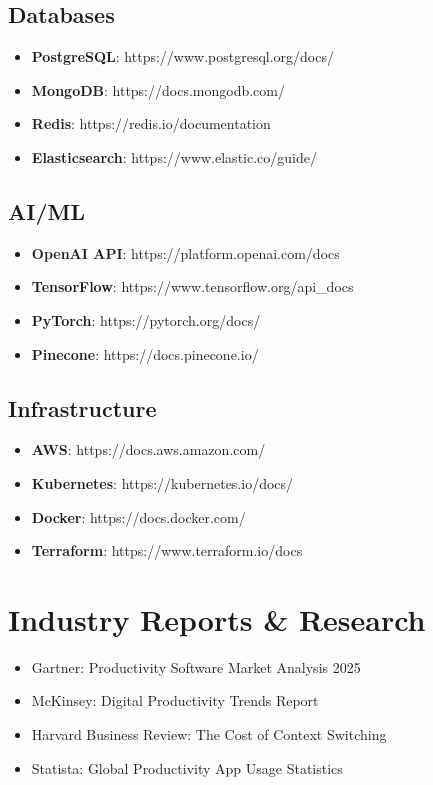 \subsection{Databases}
\begin{itemize}
    \item \textbf{PostgreSQL}: https://www.postgresql.org/docs/
    \item \textbf{MongoDB}: https://docs.mongodb.com/
    \item \textbf{Redis}: https://redis.io/documentation
    \item \textbf{Elasticsearch}: https://www.elastic.co/guide/
\end{itemize}

\subsection{AI/ML}
\begin{itemize}
    \item \textbf{OpenAI API}: https://platform.openai.com/docs
    \item \textbf{TensorFlow}: https://www.tensorflow.org/api\_docs
    \item \textbf{PyTorch}: https://pytorch.org/docs/
    \item \textbf{Pinecone}: https://docs.pinecone.io/
\end{itemize}

\subsection{Infrastructure}
\begin{itemize}
    \item \textbf{AWS}: https://docs.aws.amazon.com/
    \item \textbf{Kubernetes}: https://kubernetes.io/docs/
    \item \textbf{Docker}: https://docs.docker.com/
    \item \textbf{Terraform}: https://www.terraform.io/docs
\end{itemize}

\section{Industry Reports \& Research}

\begin{itemize}
    \item Gartner: Productivity Software Market Analysis 2025
    \item McKinsey: Digital Productivity Trends Report
    \item Harvard Business Review: The Cost of Context Switching
    \item Statista: Global Productivity App Usage Statistics
\end{itemize}

